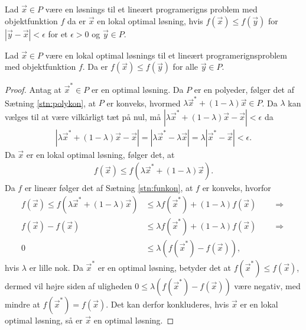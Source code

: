 \begin{defn}
Lad $\vec{x} \in P$ være en løsnings til et lineært programerigns problem med objektfunktion $f$ da er $\vec{x}$ en lokal optimal løsning, hvis $f(\vec{x}) \leq f(\vec{y})$ for $|\vec{y}-\vec{x}|< \epsilon$ for et $\epsilon > 0$ og $\vec{y} \in P$.
\end{defn}


\begin{stn}
Lad $\vec{x} \in P$ være en lokal optimal løsnings til et lineært programerignsproblem  med objektfunktion $f$.
Da er  $f(\vec{x}) \leq f(\vec{y})$ for alle $\vec{y} \in P$.
\end{stn}

\begin{proof}
Antag at $\vec{x}^* \in P$ er en optimal løsning.
Da $P$ er en polyeder, følger det af Sætning \ref{stn:polykon}, at $P$ er konveks, hvormed $\lambda \vec{x}^* + (1-\lambda)\vec{x} \in P$. 
Da $\lambda$ kan vælges til at være vilkårligt tæt på nul, må $|\lambda \vec{x}^* + (1-\lambda)\vec{x} - \vec{x}| < \epsilon$ da
\begin{align*}
 |\lambda \vec{x}^* + (1-\lambda)\vec{x} - \vec{x}| = | \lambda \vec{x}^* - \lambda\vec{x}| = \lambda|\vec{x}^* - \vec{x}| < \epsilon.
\end{align*}
Da $\vec{x}$ er en lokal optimal løsning, følger det, at
\begin{align*}
f(\vec{x}) \leq f(\lambda \vec{x}^* + (1-\lambda)\vec{x}).
\end{align*}
Da $f$ er lineær følger det af Sætning \ref{stn:funkon}, at $f$ er konveks, hvorfor
\begin{align*}
f(\vec{x}) \leq f(\lambda \vec{x}^* + (1-\lambda)\vec{x}) &\leq \lambda f(\vec{x}^*) + (1-\lambda)f(\vec{x}) \qquad \Rightarrow
\\ f(\vec{x}) - f(\vec{x}) &\leq \lambda f(\vec{x}^*) + (1-\lambda)f(\vec{x}) \qquad \Rightarrow
\\ 0 & \leq \lambda( f(\vec{x}^*) - f(\vec{x})),
\end{align*}
hvis $\lambda$ er lille nok.
Da $\vec{x}^*$ er en optimal løsning, betyder det at $f(\vec{x}^*) \leq f(\vec{x})$, dermed vil højre siden af uligheden $0 \leq \lambda( f(\vec{x}^*) - f(\vec{x}))$ være negativ, med mindre at $f(\vec{x}^*) =f(\vec{x})$. 
Det kan derfor konkluderes, hvis $\vec{x}$ er en lokal optimal løsning, så er $\vec{x}$ en optimal løsning.
\end{proof}

